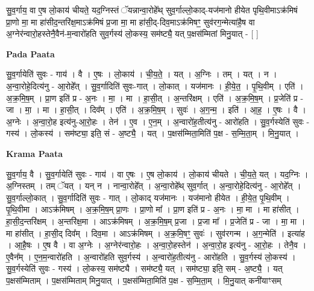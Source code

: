 \documentclass[17pt]{extarticle}
\begin{document}
सु॒व॒र्गाय॒ वा ए॒ष लो॒काय॑ चीयते॒ यद॒ग्निस्तं ॅयन्नान्वा॒रोहे᳚थ् सुव॒र्गाल्लो॒काद्-यज॑मानो हीयेत पृथि॒वीमाऽक्र॑मिषं प्रा॒णो मा॒ मा हा॑सीद॒न्तरि॑क्ष॒माऽक्र॑मिषं प्र॒जा मा॒ मा हा॑सी॒द्-दिव॒माऽक्र॑मिषꣳ॒॒ सुव॑रग॒न्मेत्या॑है॒ष वा अ॒ग्नेर॑न्वारो॒हस्तेनै॒वैन॑-म॒न्वारो॑हति सुव॒र्गस्य॑ लो॒कस्य॒ सम॑ष्ट्यै॒ यत् प॒क्षस॑म्मितां मिनु॒यात् - [  ] \newline

\textbf{Pada Paata} \newline

सु॒व॒र्गायेति॑ सुवः - गाय॑ । वै । ए॒षः । लो॒काय॑ । ची॒य॒ते॒ । यत् । अ॒ग्निः । तम् । यत् । न । अ॒न्वा॒रोहे॒दित्य॑नु - आ॒रोहे᳚त् । सु॒व॒र्गादिति॑ सुवः-गात् । लो॒कात् । यज॑मानः । ही॒ये॒त॒ । पृ॒थि॒वीम् । एति॑ । अ॒क्र॒मि॒ष॒म् । प्रा॒ण इति॑ प्र - अ॒नः । मा॒ । मा । हा॒सी॒त् । अ॒न्तरि॑क्षम् । एति॑ । अ॒क्र॒मि॒ष॒म् । प्र॒जेति॑ प्र - जा । मा॒ । मा । हा॒सी॒त् । दिव᳚म् । एति॑ । अ॒क्र॒मि॒ष॒म् । सुवः॑ । अ॒ग॒न्म॒ । इति॑ । आ॒ह॒ । ए॒षः । वै । अ॒ग्नेः । अ॒न्वा॒रो॒ह इत्य॑नु-आ॒रो॒हः । तेन॑ । ए॒व । ए॒न॒म् । अ॒न्वारो॑ह॒तीत्य॑नु - आरो॑हति । सु॒व॒र्गस्येति॑ सुवः - गस्य॑ । लो॒कस्य॑ । सम॑ष्ट्या॒ इति॒ सं - अ॒ष्ट्यै॒ । यत् । प॒क्षस॑म्मिता॒मिति॑ प॒क्ष - स॒म्मि॒ता॒म् । मि॒नु॒यात् ।  \newline


\textbf{Krama Paata} \newline

सु॒व॒र्गाय॒ वै । सु॒व॒र्गायेति॑ सुवः - गाय॑ । वा ए॒षः । ए॒ष लो॒काय॑ । लो॒काय॑ चीयते । ची॒य॒ते॒ यत् । यद॒ग्निः । अ॒ग्निस्तम् । तम् ॅयत् । यन् न । नान्वा॒रोहे᳚त् । अ॒न्वा॒रोहे᳚थ् सुव॒र्गात् । अ॒न्वा॒रोहे॒दित्य॑नु - आ॒रोहे᳚त् । सु॒व॒र्गाल्लो॒कात् । सु॒व॒र्गादिति॑ सुवः - गात् । लो॒काद् यज॑मानः । यज॑मानो हीयेत । ही॒ये॒त॒ पृ॒थि॒वीम् । पृ॒थि॒वीमा । आऽक्र॑मिषम् । अ॒क्र॒मि॒ष॒म् प्रा॒णः । प्रा॒णो मा᳚ । प्रा॒ण इति॑ प्र - अ॒नः । मा॒ मा । मा हा॑सीत् । हा॒सी॒द॒न्तरि॑क्षम् । अ॒न्तरि॑क्ष॒मा । आऽक्र॑मिषम् । अ॒क्र॒मि॒ष॒म् प्र॒जा । प्र॒जा मा᳚ । प्र॒जेति॑ प्र - जा । मा॒ मा । मा हा॑सीत् । हा॒सी॒द् दिव᳚म् । दिव॒मा । आऽक्र॑मिषम् । अ॒क्र॒मि॒षꣳ॒॒ सुवः॑ । सुव॑रगन्म । अ॒ग॒न्मेति॑ । इत्या॑ह । आ॒है॒षः । ए॒ष वै । वा अ॒ग्नेः । अ॒ग्नेर॑न्वारो॒हः । अ॒न्वा॒रो॒हस्तेन॑ । अ॒न्वा॒रो॒ह इत्य॑नु - आ॒रो॒हः । तेनै॒व । ए॒वैन᳚म् । ए॒न॒म॒न्वारो॑हति । अ॒न्वारो॑हति सुव॒र्गस्य॑ । अ॒न्वारो॑ह॒तीत्य॑नु - आरो॑हति । सु॒व॒र्गस्य॑ लो॒कस्य॑ । सु॒व॒र्गस्येति॑ सुवः - गस्य॑ । लो॒कस्य॒ सम॑ष्ट्यै । सम॑ष्ट्यै॒ यत् । सम॑ष्ट्या॒ इति॒ सम् - अ॒ष्ट्यै॒ । यत् प॒क्षस॑म्मिताम् । प॒क्षस॑म्मिताम् मिनु॒यात् । प॒क्षस॑म्मिता॒मिति॑ प॒क्ष - स॒म्मि॒ता॒म् । मि॒नु॒यात् कनी॑याꣳसम् \newline
\end{document}
